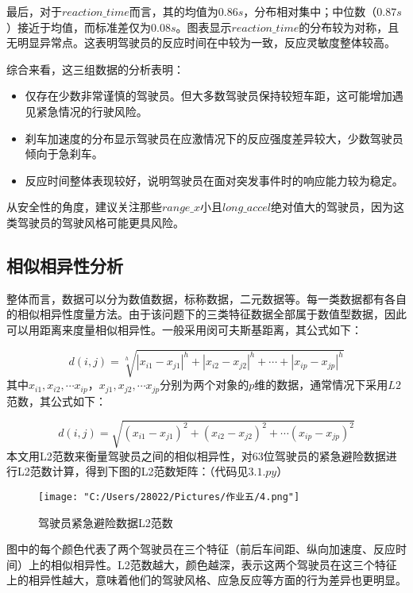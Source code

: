 \documentclass[withoutpreface,bwprint]{cumcmthesis}
\begin{document}
    最后，对于$reaction\_time$而言，其的均值为$0.86s$，分布相对集中；中位数（$0.87s$）接近于均值，而标准差仅为$0.08s$。图表显示$reaction\_time$的分布较为对称，且无明显异常点。这表明驾驶员的反应时间在中较为一致，反应灵敏度整体较高。\par
    
    综合来看，这三组数据的分析表明：\par
    \begin{itemize}
    \item 仅存在少数非常谨慎的驾驶员。但大多数驾驶员保持较短车距，这可能增加遇见紧急情况的行驶风险。
    \item 刹车加速度的分布显示驾驶员在应激情况下的反应强度差异较大，少数驾驶员倾向于急刹车。
    \item 反应时间整体表现较好，说明驾驶员在面对突发事件时的响应能力较为稳定。
    \end{itemize}\par
    从安全性的角度，建议关注那些$range\_x$小且$long\_accel$绝对值大的驾驶员，因为这类驾驶员的驾驶风格可能更具风险。

    \subsection{相似相异性分析}
    整体而言，数据可以分为数值数据，标称数据，二元数据等。每一类数据都有各自的相似相异性度量方法。由于该问题下的三类特征数据全部属于数值型数据，因此可以用距离来度量相似相异性。一般采用闵可夫斯基距离，其公式如下：\par
    \begin{equation}
        d\left( i,j \right) =\sqrt[h]{\left| x_{i1}-x_{j1} \right|^h+\left| x_{i2}-x_{j2} \right|^h+\cdots +\left| x_{ip}-x_{jp} \right|^h}
    \end{equation}
    其中$x_{i1},x_{i2},\cdots x_{ip}$，$x_{j1},x_{j2},\cdots x_{jp}$分别为两个对象的$p$维的数据，通常情况下采用$L2$范数，其公式如下：\par
    \begin{equation}
        d\left( i,j \right) =\sqrt{\left( x_{i1}-x_{j1} \right) ^2+\left( x_{i2}-x_{j2} \right) ^2+\cdots \left( x_{ip}-x_{jp} \right) ^2}
    \end{equation}
    本文用L2范数来衡量驾驶员之间的相似相异性，对63位驾驶员的紧急避险数据进行L2范数计算，得到下图的L2范数矩阵：（代码见$3.1.py$）\newpage
    \begin{figure}[!htbp] 
        \centering
        \texttt{[image: "C:/Users/28022/Pictures/作业五/4.png"]} 
        \caption{驾驶员紧急避险数据L2范数} 
        \label{fig:example} 
    \end{figure}
    图中的每个颜色代表了两个驾驶员在三个特征（前后车间距、纵向加速度、反应时间）上的相似相异性。L2范数越大，颜色越深，表示这两个驾驶员在这三个特征上的相异性越大，意味着他们的驾驶风格、应急反应等方面的行为差异也更明显。\par
\end{document}
